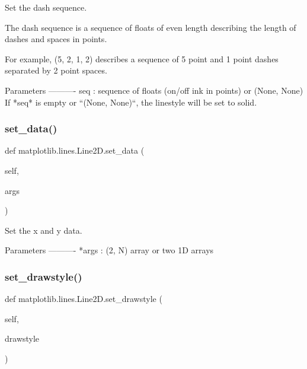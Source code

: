 \begin{DoxyVerb}Set the dash sequence.

The dash sequence is a sequence of floats of even length describing
the length of dashes and spaces in points.

For example, (5, 2, 1, 2) describes a sequence of 5 point and 1 point
dashes separated by 2 point spaces.

Parameters
----------
seq : sequence of floats (on/off ink in points) or (None, None)
    If *seq* is empty or ``(None, None)``, the linestyle will be set
    to solid.
\end{DoxyVerb}
 \mbox{\label{classmatplotlib_1_1lines_1_1Line2D_ae1d3608629a68c73865cfed1709eab8b}} 
\subsubsection{\texorpdfstring{set\+\_\+data()}{set\_data()}}
{\footnotesize\ttfamily def matplotlib.\+lines.\+Line2\+D.\+set\+\_\+data (\begin{DoxyParamCaption}\item[{}]{self,  }\item[{}]{args }\end{DoxyParamCaption})}

\begin{DoxyVerb}Set the x and y data.

Parameters
----------
*args : (2, N) array or two 1D arrays
\end{DoxyVerb}
 \mbox{\label{classmatplotlib_1_1lines_1_1Line2D_aa8b64c52b0e0b440e196cbc2ed432b79}} 
\subsubsection{\texorpdfstring{set\+\_\+drawstyle()}{set\_drawstyle()}}
{\footnotesize\ttfamily def matplotlib.\+lines.\+Line2\+D.\+set\+\_\+drawstyle (\begin{DoxyParamCaption}\item[{}]{self,  }\item[{}]{drawstyle }\end{DoxyParamCaption})}

